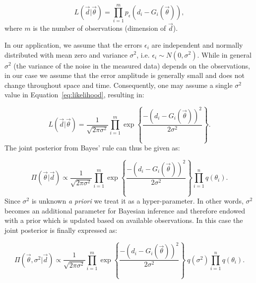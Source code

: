 \begin{equation} 
L(\vec d |  \vec{\theta}) 
= 
\prod_{i=1}^m  
p_\epsilon (d_i - G_i(\vec \theta)), 	
\label{eq:likelihood}
\end{equation}
where $m$ is the number of observations (dimension of $\vec{d}$).

In our application, we assume that the errors $\epsilon_i$ are independent
and normally distributed with mean
zero and variance $\sigma^2$, i.e. $\epsilon_i \sim N(0,\sigma^2)$. 
While in general $\sigma^2$ (the variance of the noise in the measured data) depends on the observations, in our case we assume that the error
amplitude is generally small and does not change throughout space and time.
Consequently, one may assume a single $\sigma^2$ value in Equation~\eqref{eq:likelihood},
resulting in:

\begin{equation} 
L(\vec d |  \vec{\theta}) 
= 
\frac{1}{\sqrt{2 \pi \sigma^2}}\prod_{i=1}^m   
\exp \left\lbrace \frac{-(d_i - G_i(\vec \theta))^2}{2 \sigma^2} \right\rbrace. 	
\label{eq:likelihood2}
\end{equation}
The joint posterior from Bayes' rule can thus be given as:

\begin{equation} 
\Pi(\vec{\theta}| \vec d)
\propto
\frac{1}{\sqrt{2 \pi \sigma^2}}   \prod_{i=1}^m  
\exp \left\lbrace \frac{-(d_i - G_i(\vec \theta))^2}{2 \sigma^2} \right\rbrace  
\prod_{i=1}^n q(\theta_i).
\end{equation}
Since $\sigma^2$ is unknown \emph{a priori} we treat it as a hyper-parameter.
In other words, $\sigma^2$ becomes an additional parameter for Bayesian inference and  
therefore endowed with a prior which is updated based on available observations. In this 
case the joint posterior is finally expressed as:

\begin{equation} 
\Pi(\vec{\theta},\sigma^2 | \vec d)
\propto
\frac{1}{\sqrt{2 \pi \sigma^2}}   \prod_{i=1}^m  
\exp \left\lbrace \frac{-(d_i - G_i(\vec \theta))^2}{2 \sigma^2} \right\rbrace
\ q(\sigma^2) \prod_{i=1}^n q(\theta_i).
\label{eq:post}
\end{equation}

